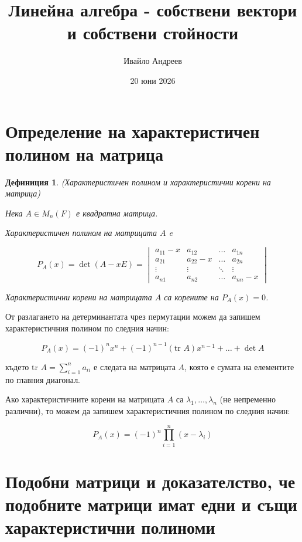 \documentclass{scrartcl}
\title{Линейна алгебра - собствени вектори и собствени стойности}
\author{Ивайло Андреев}
\date{20 юни 2026}
\newtheorem{definition}{Дефиниция}
\begin{document}
\maketitle

\tableofcontents

\newpage

\begin{FlushLeft}

\section{Определение на характеристичен полином на матрица}

\begin{definition}
(Характеристичен полином и характеристични корени на матрица)

Нека $A \in M_n(F)$ е квадратна матрица.

Характеристичен полином на матрицата $A$ e

$$
P_A(x) = \det(A - x E) =
\begin{vmatrix}
    a_{11} - x & a_{12} & \dots & a_{1n}\\
    a_{21} & a_{22} - x & \dots & a_{2n}\\
    \vdots & \vdots & \ddots & \vdots\\
    a_{n1} & a_{n2} & \dots & a_{nn} - x
\end{vmatrix}
$$

Характеристични корени на матрицата $A$ са корените на $P_A(x) = 0$.
\end{definition}

От разлагането на детерминантата чрез пермутации можем да запишем характеристичния полином по следния начин:

$$P_A(x) = (-1)^n x^n + (-1)^{n-1}(\text{tr }A) x^{n-1}+ \dots + \det A$$

където $\text{tr }A = \displaystyle\sum_{i=1}^{n}a_{ii}$ е следата на матрицата $A$, която е сумата на елементите по главния диагонал.

Ако характеристичните корени на матрицата $A$ са $\lambda_1, \dots, \lambda_n$ (не непременно различни), то можем да запишем характеристичния полином по следния начин:

$$P_A(x) = (-1)^n \prod_{i=1}^n (x - \lambda_i)$$

\section{Подобни матрици и доказателство, че подобните матрици имат едни и същи характеристични полиноми}


\end{FlushLeft}
\end{document}
